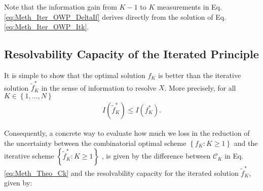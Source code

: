 Note that the information gain from $K-1$ to $K$ measurements in Eq. \eqref{eq:Meth_Iter_OWP_DeltaIf} derives directly from  the solution of Eq. \eqref{eq:Meth_Iter_OWP_Itk}. 



































































\subsection{Resolvability Capacity of the Iterated Principle}


It is simple to show that the optimal solution $f_{K}$ is better than the iterative solution $\tilde{f}^{*}_{K}$ in the sense of information to resolve $X$. More precisely,  for all  $K \in   \left\{1,\ldots,N \right\}$
\begin{align}\label{eq:Meth_Iter_OWP_Prop_If}
	I(\tilde{f}^{*}_{K}) \leq I({f}^{*}_{K}). 
\end{align}

Consequently, a concrete way to evaluate how much we loss in the reduction of the uncertainty between 
the combinatorial optimal scheme $\left\{{f}_{K}: K\geq 1 \right\}$ and the iterative scheme $\left\{\tilde{f}^{*}_{K}: K \geq 1 \right\}$ , %
 is given by the difference between $\mathcal{C}_{K}$ in Eq. \eqref{eq:Meth_Theo_Ck} and the resolvability capacity for the iterated solution $\tilde{f}^{*}_{K}$, given by: 

